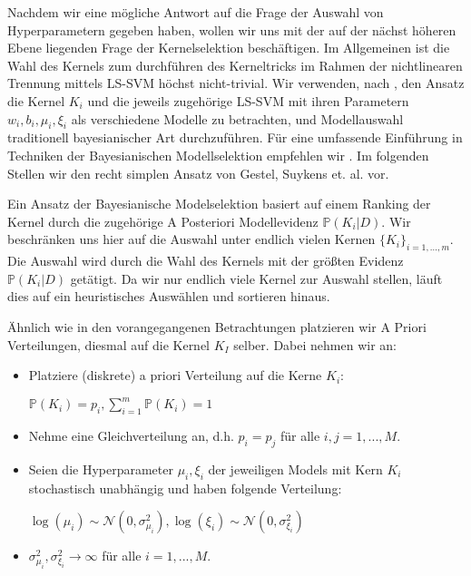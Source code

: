 \documentclass{report}
\theoremstyle{linebreak}
\begin{document}



Nachdem wir eine mögliche Antwort auf die Frage der Auswahl von Hyperparametern gegeben haben, wollen wir uns mit der auf der nächst höheren Ebene liegenden Frage der Kernelselektion beschäftigen. Im Allgemeinen ist die Wahl des Kernels zum durchführen des Kerneltricks im Rahmen der nichtlinearen Trennung mittels LS-SVM höchst nicht-trivial. Wir verwenden, nach \cite{LS-SVM}, den Ansatz die Kernel $K_i$ und die jeweils zugehörige LS-SVM mit ihren Parametern $w_i, b_i, \mu_i, \xi_i$ als verschiedene Modelle zu betrachten, und Modellauswahl traditionell bayesianischer Art durchzuführen. Für eine umfassende Einführung in Techniken der Bayesianischen Modellselektion empfehlen wir \cite{Bayes_model_selection}. Im folgenden Stellen wir den recht simplen Ansatz von Gestel, Suykens et. al. vor.

Ein Ansatz der Bayesianische Modelselektion basiert auf einem Ranking der Kernel durch die zugehörige A Posteriori Modellevidenz $\mathbb{P}(K_i\vert D)$. Wir beschränken uns hier auf die Auswahl unter endlich vielen Kernen $\{K_i\}_{i=1,...,m}$. Die Auswahl wird durch die Wahl des Kernels mit der größten Evidenz $\mathbb{P}(K_i\vert D)$ getätigt. Da wir nur endlich viele Kernel zur Auswahl stellen, läuft dies auf ein heuristisches Auswählen und sortieren hinaus.

Ähnlich wie in den vorangegangenen Betrachtungen platzieren wir A Priori Verteilungen, diesmal auf die Kernel $K_I$ selber. Dabei nehmen wir an:

\begin{itemize}
	\item Platziere (diskrete) a priori Verteilung auf die Kerne $K_i$:
		\begin{center}
			$\mathbb{P}(K_i) = p_i, \sum_{i=1}^{m} \mathbb{P}(K_i) = 1$
		\end{center}
	\item Nehme eine Gleichverteilung an, d.h. $p_i = p_j$ für alle $i,j = 1,...,M$.
	\item Seien die Hyperparameter $\mu_i, \xi_i$ der jeweiligen Models mit Kern $K_i$ 				  stochastisch unabhängig und haben folgende Verteilung:
		  \begin{center}
				$\log(\mu_i) \sim \mathcal{N}(0, \sigma_{\mu_i}^2), \log(\xi_i) \sim 						\mathcal{N}(0, \sigma_{\xi_i}^2)$ 
		  \end{center}
	\item $\sigma_{\mu_i}^2, \sigma_{\xi_i}^2 \rightarrow \infty$ für alle $i = 1,...,M				   $.
\end{itemize}
\end{document}
